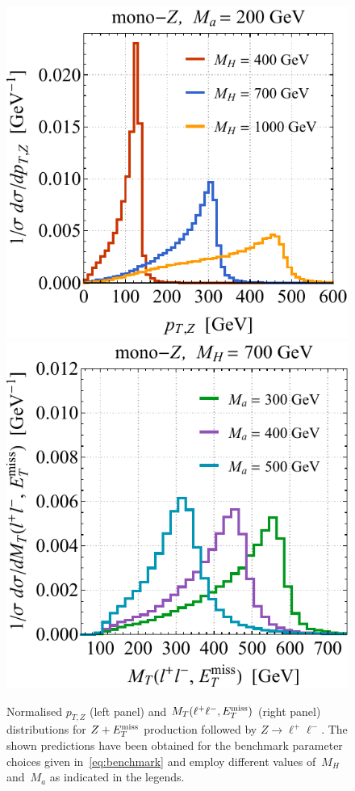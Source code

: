 \begin{figure}[t!]
\centering
\includegraphics[height=0.45\textwidth]{texinputs/04_grid/newfigures/ptzspec.pdf}	\qquad 
\includegraphics[height=0.45\textwidth]{texinputs/04_grid/newfigures/mtspec.pdf}
\vspace{2mm}
\caption{\label{fig:zptmt} Normalised $p_{T,Z}$ (left panel) and $M_T (\ell^+ \ell^-, E_T^\mathrm{miss})$ (right panel) distributions for $Z + E_T^\mathrm{miss}$ production followed by $Z \to \ell^+ \ell^-$. The shown predictions have been obtained for the \hdma benchmark parameter choices  given in~\eqref{eq:benchmark} and employ different values of~$M_H$ and~$M_a$ as indicated in the legends.}
\end{figure}


